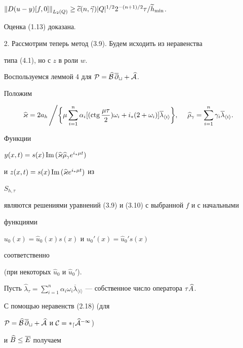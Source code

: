 ${\ver D(u-y)[f,0]\ver}_{L_2(Q)}\ge \widetilde c(n,\Vec\gamma)


\vert Q\vert^{1/2}2^{-(n+1)/2}\tau/\widetilde h_{\min}$.


Оценка (1.13) доказана.





2. Рассмотрим теперь метод (3.9). Будем исходить из неравенства


типа (4.1), но с $z$ в роли $w$.





Воспользуемся леммой 4 для $\cal P=\widehat B\,\overline\partial_t+\widehat A$. 


Положим


$$


\widehat\varkappa=2a_h \left/ \biggl\{\mu\sum_{i=1}^n\alpha_i[(\ctg


\frac{\mu\tau}{2})\omega_i+i_*(2+\omega_i)]\overline


\lambda_{\langle i\rangle}\biggr\},\right.


\quad


\widehat\rho_\gamma=\sum_{i=1}^n\gamma_i\overline\lambda_{\langle i\rangle}.


$$


Функции 


$y(x,t)=s(x)\text{\,Im\,}(\widehat\varkappa\widehat\rho_\gamma e^{i_*\mu t})$ 


и $z(x,t)=s(x)\text{\,Im\,}(\widehat\varkappa e^{i_*\mu t})$ из


$S_{h,\tau}$


являются решениями уравнений (3.9) и (3.10) с выбранной $f$ и с начальными 


функциями 


$u_0(x)=\widehat u_0(x)s(x)$ и $u_0'(x)=\widehat u_0's(x)$


соответственно


(при некоторых $\widehat u_0$ и $\widehat u_0'$).





Пусть $\widehat\lambda_\tau=\sum_{i=1}^n\alpha_i\omega_i


\overline\lambda_{\langle i\rangle}$ --- собственное число оператора $\tau\aaa$.


С помощью неравенств (2.18) (для 


$\cal P=\widehat B\,\overline\partial_t+\widehat A$ и $\cal C=\Lambda_d\widehat A^{-1}$)


и $\widehat B\le\overline E$ получаем


